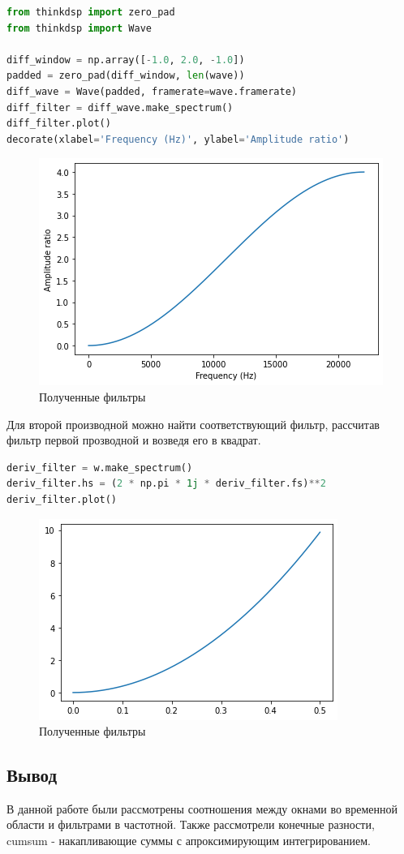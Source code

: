 \begin{lstlisting}[language=Python]
from thinkdsp import zero_pad
from thinkdsp import Wave

diff_window = np.array([-1.0, 2.0, -1.0])
padded = zero_pad(diff_window, len(wave))
diff_wave = Wave(padded, framerate=wave.framerate)
diff_filter = diff_wave.make_spectrum()
diff_filter.plot()
decorate(xlabel='Frequency (Hz)', ylabel='Amplitude ratio')
\end{lstlisting}

\begin{figure}[H]
	\begin{center}
		\includegraphics[scale=1]{fig/lab09/lab09_15.png}
		\caption{Полученные фильтры}
	\end{center}
\end{figure}

Для второй производной можно найти соответствующий фильтр, рассчитав фильтр первой прозводной и возведя его в квадрат.
\begin{lstlisting}[language=Python]
deriv_filter = w.make_spectrum()
deriv_filter.hs = (2 * np.pi * 1j * deriv_filter.fs)**2
deriv_filter.plot()
\end{lstlisting}

\begin{figure}[H]
	\begin{center}
		\includegraphics[scale=1]{fig/lab09/lab09_16.png}
		\caption{Полученные фильтры}
	\end{center}
\end{figure}


\subsection{Вывод}

В данной работе были рассмотрены соотношения между окнами во временной области и фильтрами в частотной. Также рассмотрели конечные разности, cumsum - накапливающие суммы с апроксимирующим интегрированием.
